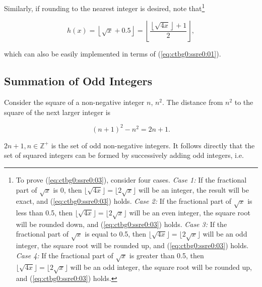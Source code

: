 Similarly, if rounding to the nearest integer is desired, note that\footnote{To
prove (\ref{eq:ctbg0:ssre0:03}), consider four cases.  \emph{Case 1:} If the fractional part of
$\sqrt{x}$ is 0, then $\lfloor \sqrt{4x} \rfloor = \lfloor 2 \sqrt{x} \rfloor$
will be an integer, the result will be exact, and (\ref{eq:ctbg0:ssre0:03}) holds.
\emph{Case 2:} If the fractional part of
$\sqrt{x}$ is less than 0.5, then $\lfloor \sqrt{4x} \rfloor = \lfloor 2 \sqrt{x} \rfloor$
will be an even integer, the square root will be rounded down, and (\ref{eq:ctbg0:ssre0:03}) holds.
\emph{Case 3:} If the fractional part of
$\sqrt{x}$ is equal to 0.5, then $\lfloor \sqrt{4x} \rfloor = \lfloor 2 \sqrt{x} \rfloor$
will be an odd integer, the square root will be rounded up, and (\ref{eq:ctbg0:ssre0:03}) holds.
\emph{Case 4:} If the fractional part of
$\sqrt{x}$ is greater than 0.5, then $\lfloor \sqrt{4x} \rfloor = \lfloor 2 \sqrt{x} \rfloor$
will be an odd integer, the square root will be rounded up, and (\ref{eq:ctbg0:ssre0:03}) holds.}

\begin{equation}
\label{eq:ctbg0:ssre0:03}
h(x) = \left\lfloor \sqrt{x} + 0.5 \right\rfloor
     = \left\lfloor \frac{\left\lfloor \sqrt{4 x} \right\rfloor + 1}{2} \right\rfloor ,
\end{equation}

\noindent{}which can also be easily implemented in terms of (\ref{eq:ctbg0:ssre0:01}).


\subsection{Summation of Odd Integers}
\label{ctbg0:ssre0:ssoi0}

Consider the square of a non-negative integer $n$, $n^2$.  The distance from
$n^2$ to the square of the next larger integer is

\begin{equation}
\label{eq:ctbg0:ssre0:ssoi0:01}
(n+1)^2 - n^2 = 2n + 1 .
\end{equation}

$2n+1, n \in \mathbb{Z}^+$ is the set of odd non-negative integers.
It follows directly that the set of squared integers can be formed by
successively adding odd integers, i.e.

